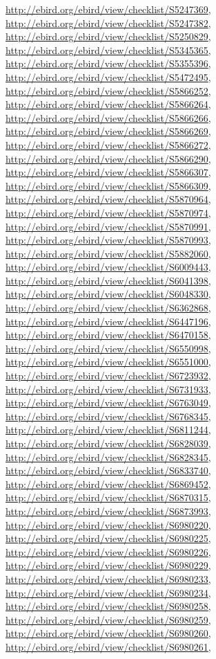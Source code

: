 \documentclass[9pt, article]{memoir}
\begin{document}
\begin{multicols}{2}
\url{http://ebird.org/ebird/view/checklist/S5247369}, 
\url{http://ebird.org/ebird/view/checklist/S5247382}, 
\url{http://ebird.org/ebird/view/checklist/S5250829}, 
\url{http://ebird.org/ebird/view/checklist/S5345365}, 
\url{http://ebird.org/ebird/view/checklist/S5355396}, 
\url{http://ebird.org/ebird/view/checklist/S5472495}, 
\url{http://ebird.org/ebird/view/checklist/S5866252}, 
\url{http://ebird.org/ebird/view/checklist/S5866264}, 
\url{http://ebird.org/ebird/view/checklist/S5866266}, 
\url{http://ebird.org/ebird/view/checklist/S5866269}, 
\url{http://ebird.org/ebird/view/checklist/S5866272}, 
\url{http://ebird.org/ebird/view/checklist/S5866290}, 
\url{http://ebird.org/ebird/view/checklist/S5866307}, 
\url{http://ebird.org/ebird/view/checklist/S5866309}, 
\url{http://ebird.org/ebird/view/checklist/S5870964}, 
\url{http://ebird.org/ebird/view/checklist/S5870974}, 
\url{http://ebird.org/ebird/view/checklist/S5870991}, 
\url{http://ebird.org/ebird/view/checklist/S5870993}, 
\url{http://ebird.org/ebird/view/checklist/S5882060}, 
\url{http://ebird.org/ebird/view/checklist/S6009443}, 
\url{http://ebird.org/ebird/view/checklist/S6041398}, 
\url{http://ebird.org/ebird/view/checklist/S6048330}, 
\url{http://ebird.org/ebird/view/checklist/S6362868}, 
\url{http://ebird.org/ebird/view/checklist/S6447196}, 
\url{http://ebird.org/ebird/view/checklist/S6470158}, 
\url{http://ebird.org/ebird/view/checklist/S6550998}, 
\url{http://ebird.org/ebird/view/checklist/S6551000}, 
\url{http://ebird.org/ebird/view/checklist/S6723932}, 
\url{http://ebird.org/ebird/view/checklist/S6731933}, 
\url{http://ebird.org/ebird/view/checklist/S6763049}, 
\url{http://ebird.org/ebird/view/checklist/S6768345}, 
\url{http://ebird.org/ebird/view/checklist/S6811244}, 
\url{http://ebird.org/ebird/view/checklist/S6828039}, 
\url{http://ebird.org/ebird/view/checklist/S6828345}, 
\url{http://ebird.org/ebird/view/checklist/S6833740}, 
\url{http://ebird.org/ebird/view/checklist/S6869452}, 
\url{http://ebird.org/ebird/view/checklist/S6870315}, 
\url{http://ebird.org/ebird/view/checklist/S6873993}, 
\url{http://ebird.org/ebird/view/checklist/S6980220}, 
\url{http://ebird.org/ebird/view/checklist/S6980225}, 
\url{http://ebird.org/ebird/view/checklist/S6980226}, 
\url{http://ebird.org/ebird/view/checklist/S6980229}, 
\url{http://ebird.org/ebird/view/checklist/S6980233}, 
\url{http://ebird.org/ebird/view/checklist/S6980234}, 
\url{http://ebird.org/ebird/view/checklist/S6980258}, 
\url{http://ebird.org/ebird/view/checklist/S6980259}, 
\url{http://ebird.org/ebird/view/checklist/S6980260}, 
\url{http://ebird.org/ebird/view/checklist/S6980261}, 

\end{multicols}
\end{document}
